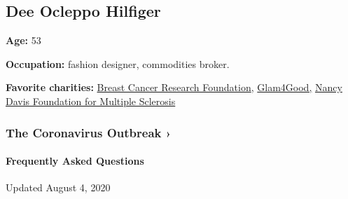 \hypertarget{dee-ocleppo-hilfiger}{%
\subsection{Dee Ocleppo Hilfiger}\label{dee-ocleppo-hilfiger}}

\textbf{Age:} 53

\textbf{Occupation:} fashion designer, commodities broker.

\textbf{Favorite charities:} \href{https://www.bcrf.org}{Breast Cancer
Research Foundation}, \href{https://glam4good.com}{Glam4Good,}
\href{https://www.erasems.org}{Nancy Davis Foundation for Multiple
Sclerosis}

\href{https://www.nytimes.com/news-event/coronavirus?action=click\&pgtype=Article\&state=default\&region=MAIN_CONTENT_3\&context=storylines_faq}{}

\hypertarget{the-coronavirus-outbreak-}{%
\subsubsection{The Coronavirus Outbreak
›}\label{the-coronavirus-outbreak-}}

\hypertarget{frequently-asked-questions}{%
\paragraph{Frequently Asked
Questions}\label{frequently-asked-questions}}

Updated August 4, 2020

